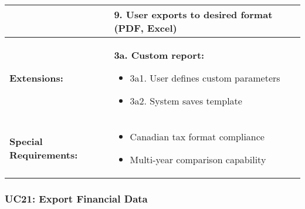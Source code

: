 \documentclass[12pt]{article}
\begin{document}
\begin{longtable}{|p{3cm}|p{11cm}|}
& 9. User exports to desired format (PDF, Excel) \\
\hline
\textbf{Extensions:} & 
\textbf{3a. Custom report:}
\begin{itemize}
    \item 3a1. User defines custom parameters
    \item 3a2. System saves template
\end{itemize} \\
\hline
\textbf{Special Requirements:} & 
\begin{itemize}
    \item Canadian tax format compliance
    \item Multi-year comparison capability
\end{itemize}
\hline
\end{longtable}


\subsubsection{UC21: Export Financial Data}
\end{document}
